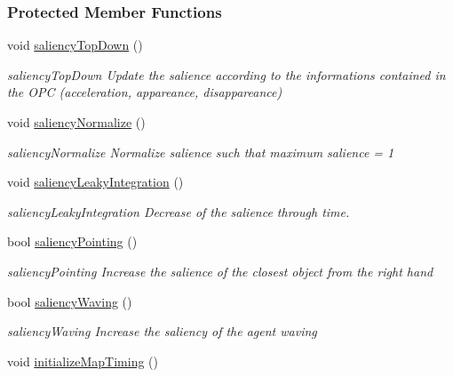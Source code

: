 \subsubsection*{Protected Member Functions}
\begin{DoxyCompactItemize}
\item 
void \hyperlink{group__pasar_a8b6edeeb377af6f56cf8636c7a5471f3}{saliency\+Top\+Down} ()
\begin{DoxyCompactList}\small\item\em saliency\+Top\+Down Update the salience according to the informations contained in the O\+PC (acceleration, appareance, disappareance) \end{DoxyCompactList}\item 
void \hyperlink{group__pasar_aecae0bd601883938d95be10c5f6990af}{saliency\+Normalize} ()
\begin{DoxyCompactList}\small\item\em saliency\+Normalize Normalize salience such that maximum salience = 1 \end{DoxyCompactList}\item 
void \hyperlink{group__pasar_af3892b35d0d3ee7cbc24a9db8d6709c7}{saliency\+Leaky\+Integration} ()
\begin{DoxyCompactList}\small\item\em saliency\+Leaky\+Integration Decrease of the salience through time. \end{DoxyCompactList}\item 
bool \hyperlink{group__pasar_a8c64b45d628f72c5a944f1952a5947b0}{saliency\+Pointing} ()
\begin{DoxyCompactList}\small\item\em saliency\+Pointing Increase the salience of the closest object from the right hand \end{DoxyCompactList}\item 
bool \hyperlink{group__pasar_a19ed41388e9bfb8f64f3b797212bdedb}{saliency\+Waving} ()
\begin{DoxyCompactList}\small\item\em saliency\+Waving Increase the saliency of the agent waving \end{DoxyCompactList}\item 
void \hyperlink{group__pasar_aa26ef95a5127bb6b5004ce879f8d43be}{initialize\+Map\+Timing} ()
\end{DoxyCompactItemize}
